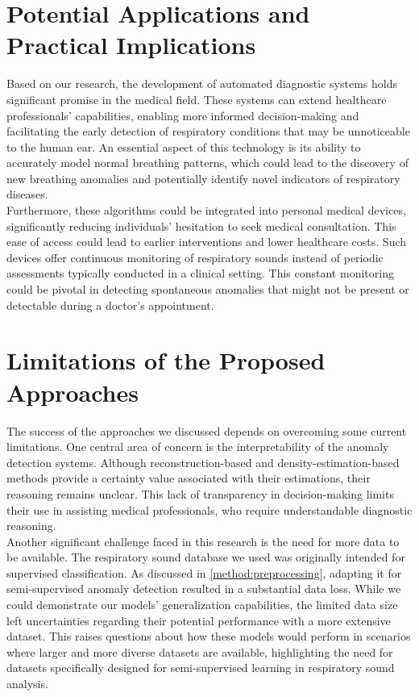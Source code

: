 \section{Potential Applications and Practical Implications}
Based on our research, the development of automated diagnostic systems holds significant promise in the medical field. These systems can extend healthcare professionals' capabilities, enabling more informed decision-making and facilitating the early detection of respiratory conditions that may be unnoticeable to the human ear. An essential aspect of this technology is its ability to accurately model normal breathing patterns, which could lead to the discovery of new breathing anomalies and potentially identify novel indicators of respiratory diseases.\\
Furthermore, these algorithms could be integrated into personal medical devices, significantly reducing individuals' hesitation to seek medical consultation. This ease of access could lead to earlier interventions and lower healthcare costs. Such devices offer continuous monitoring of respiratory sounds instead of periodic assessments typically conducted in a clinical setting. This constant monitoring could be pivotal in detecting spontaneous anomalies that might not be present or detectable during a doctor's appointment.
\section{Limitations of the Proposed Approaches}
The success of the approaches we discussed depends on overcoming some current limitations. One central area of concern is the interpretability of the anomaly detection systems. Although reconstruction-based and density-estimation-based methods provide a certainty value associated with their estimations, their reasoning remains unclear. This lack of transparency in decision-making limits their use in assisting medical professionals, who require understandable diagnostic reasoning.\\
Another significant challenge faced in this research is the need for more data to be available. The respiratory sound database we used was originally intended for supervised classification. As discussed in \autoref{method:preprocessing}, adapting it for semi-supervised anomaly detection resulted in a substantial data loss. While we could demonstrate our models' generalization capabilities, the limited data size left uncertainties regarding their potential performance with a more extensive dataset. This raises questions about how these models would perform in scenarios where larger and more diverse datasets are available, highlighting the need for datasets specifically designed for semi-supervised learning in respiratory sound analysis.
